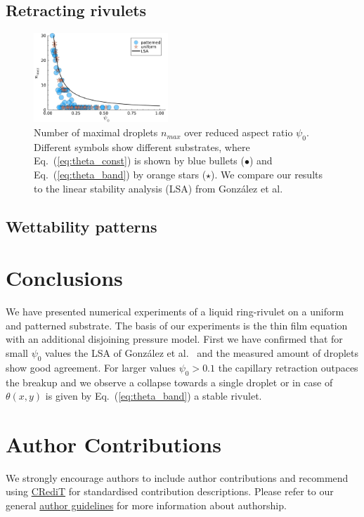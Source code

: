\documentclass[twoside,twocolumn,9pt]{article}
\begin{document}
\subsection{Retracting rivulets}\label{subsec:retract}
\begin{figure}
    \centering
    \includegraphics[width=0.45\textwidth]{assets/LSA_droplets.pdf}
    \caption{Number of maximal droplets $n_{max}$ over reduced aspect ratio $\psi_0$.
    Different symbols show different substrates, where Eq.~(\ref{eq:theta_const}) is shown by blue bullets (\textcolor{jlblue}{$\bullet$}) and Eq.~(\ref{eq:theta_band}) by orange stars (\textcolor{jlorange}{$\star$}).
    We compare our results to the linear stability analysis (LSA) from Gonz{\'a}lez et al.~\cite{gonzalezStabilityLiquidRing2013}}
    \label{fig:max_drops}
\end{figure}

\subsection{Wettability patterns}\label{subsec:wettability}


\section{Conclusions}\label{sec:conclu}
We have presented numerical experiments of a liquid ring-rivulet on a uniform and patterned substrate. 
The basis of our experiments is the thin film equation with an additional disjoining pressure model.
First we have confirmed that for small $\psi_0$ values the LSA of Gonz{\'a}lez et al.~\cite{gonzalezStabilityLiquidRing2013} and the measured amount of droplets show good agreement.
For larger values $\psi_0 > 0.1$ the capillary retraction outpaces the breakup and we observe a collapse towards a single droplet or in case of $\theta(x,y)$ is given by Eq.~(\ref{eq:theta_band}) a stable rivulet.



\section*{Author Contributions}
We strongly encourage authors to include author contributions and recommend using \href{https://casrai.org/credit/}{CRediT} for standardised contribution descriptions. Please refer to our general \href{https://www.rsc.org/journals-books-databases/journal-authors-reviewers/author-responsibilities/}{author guidelines} for more information about authorship.
\end{document}
